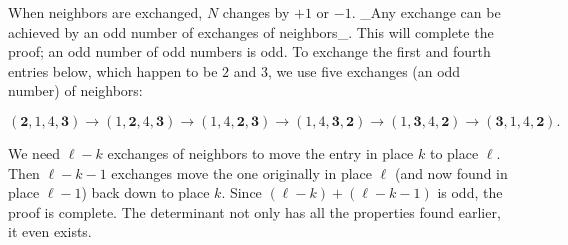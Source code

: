 When neighbors are exchanged, \(N\) changes by \(+1\) or \(-1\). _Any exchange can be achieved by an odd number of exchanges of neighbors_. This will complete the proof; an odd number of odd numbers is odd. To exchange the first and fourth entries below, which happen to be \(2\) and \(3\), we use five exchanges (an odd number) of neighbors:

\[(\mathbf{2},1,4,\mathbf{3})\rightarrow(1,\mathbf{2},4,\mathbf{3})\rightarrow( 1,4,\mathbf{2},\mathbf{3})\rightarrow(1,4,\mathbf{3},\mathbf{2})\rightarrow( 1,\mathbf{3},4,\mathbf{2})\rightarrow(\mathbf{3},1,4,\mathbf{2}).\]

We need \(\ell-k\) exchanges of neighbors to move the entry in place \(k\) to place \(\ell\). Then \(\ell-k-1\) exchanges move the one originally in place \(\ell\) (and now found in place \(\ell-1\)) back down to place \(k\). Since \((\ell-k)+(\ell-k-1)\) is odd, the proof is complete. The determinant not only has all the properties found earlier, it even exists.

 